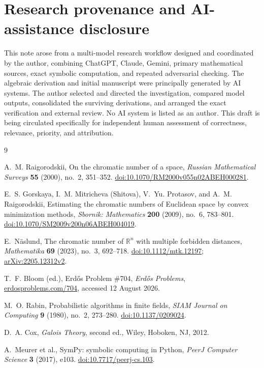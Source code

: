 \documentclass[11pt]{article}
\theoremstyle{remark}
\begin{document}
\section*{Research provenance and AI-assistance disclosure}
This note arose from a multi-model research workflow designed and coordinated by the author, combining ChatGPT, Claude, Gemini, primary mathematical sources, exact symbolic computation, and repeated adversarial checking. The algebraic derivation and initial manuscript were principally generated by AI systems. The author selected and directed the investigation, compared model outputs, consolidated the surviving derivations, and arranged the exact verification and external review. No AI system is listed as an author. This draft is being circulated specifically for independent human assessment of correctness, relevance, priority, and attribution.

\begin{thebibliography}{9}

A.~M. Raigorodskii,
\newblock On the chromatic number of a space,
\newblock \emph{Russian Mathematical Surveys} \textbf{55} (2000), no.~2, 351--352.
\newblock \href{https://doi.org/10.1070/RM2000v055n02ABEH000281}{doi:10.1070/RM2000v055n02ABEH000281}.

E.~S. Gorskaya, I.~M. Mitricheva (Shitova), V.~Yu. Protasov, and A.~M. Raigorodskii,
\newblock Estimating the chromatic numbers of Euclidean space by convex minimization methods,
\newblock \emph{Sbornik: Mathematics} \textbf{200} (2009), no.~6, 783--801.
\newblock \href{https://doi.org/10.1070/SM2009v200n06ABEH004019}{doi:10.1070/SM2009v200n06ABEH004019}.

E.~N\"aslund,
\newblock The chromatic number of \(\mathbb R^n\) with multiple forbidden distances,
\newblock \emph{Mathematika} \textbf{69} (2023), no.~3, 692--718.
\newblock \href{https://doi.org/10.1112/mtk.12197}{doi:10.1112/mtk.12197}; \href{https://arxiv.org/abs/2205.12312}{arXiv:2205.12312v2}.

T.~F. Bloom (ed.),
\newblock Erd\H{o}s Problem \#704,
\newblock \emph{Erd\H{o}s Problems},
\newblock \href{https://www.erdosproblems.com/704}{erdosproblems.com/704}, accessed 12 August 2026.

M.~O. Rabin,
\newblock Probabilistic algorithms in finite fields,
\newblock \emph{SIAM Journal on Computing} \textbf{9} (1980), no.~2, 273--280.
\newblock \href{https://doi.org/10.1137/0209024}{doi:10.1137/0209024}.

D.~A. Cox,
\newblock \emph{Galois Theory}, second ed.,
\newblock Wiley, Hoboken, NJ, 2012.

A.~Meurer et al.,
\newblock SymPy: symbolic computing in Python,
\newblock \emph{PeerJ Computer Science} \textbf{3} (2017), e103.
\newblock \href{https://doi.org/10.7717/peerj-cs.103}{doi:10.7717/peerj-cs.103}.

\end{thebibliography}
\end{document}
